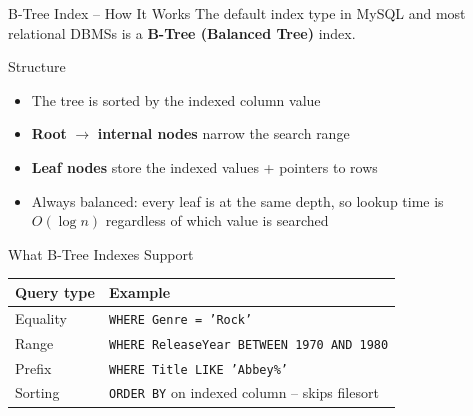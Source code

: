 \begin{frame}{B-Tree Index -- How It Works}
  The default index type in MySQL and most relational DBMSs is a
  \textbf{B-Tree (Balanced Tree)} index.

  \begin{block}{Structure}
    \begin{itemize}
      \item The tree is sorted by the indexed column value
      \item \textbf{Root} $\to$ \textbf{internal nodes} narrow the search range
      \item \textbf{Leaf nodes} store the indexed values + pointers to rows
      \item Always balanced: every leaf is at the same depth,
            so lookup time is $O(\log n)$ regardless of which value is searched
    \end{itemize}
  \end{block}

  \begin{block}{What B-Tree Indexes Support}
    \begin{tabular}{@{}ll@{}}
      \toprule
      \textbf{Query type} & \textbf{Example} \\
      \midrule
      Equality   & \texttt{WHERE Genre = 'Rock'} \\
      Range      & \texttt{WHERE ReleaseYear BETWEEN 1970 AND 1980} \\
      Prefix     & \texttt{WHERE Title LIKE 'Abbey\%'} \\
      Sorting    & \texttt{ORDER BY} on indexed column -- skips filesort \\
      \bottomrule
    \end{tabular}
  \end{block}
\end{frame}

